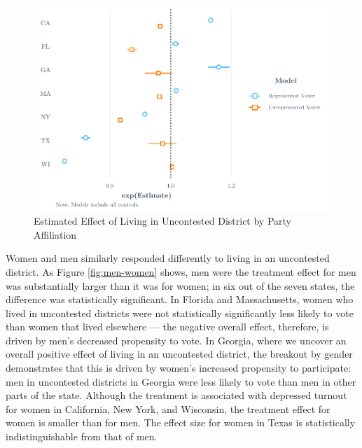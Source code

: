 \documentclass[
  12pt,
]{article}
\begin{document}
\begin{figure}[H]

{\centering \includegraphics{write_files/figure-latex/party-1} 

}

\caption{\label{fig:party}Estimated Effect of Living in Uncontested District by Party Affiliation}\label{fig:party}
\end{figure}

Women and men similarly responded differently to living in an uncontested district. As Figure \ref{fig:men-women} shows, men were the treatment effect for men was substantially larger than it was for women; in six out of the seven states, the difference was statistically significant. In Florida and Massachusetts, women who lived in uncontested districts were not statistically significantly less likely to vote than women that lived elsewhere --- the negative overall effect, therefore, is driven by men's decreased propensity to vote. In Georgia, where we uncover an overall positive effect of living in an uncontested district, the breakout by gender demonstrates that this is driven by women's increased propensity to participate: men in uncontested districts in Georgia were less likely to vote than men in other parts of the state. Although the treatment is associated with depressed turnout for women in California, New York, and Wisconsin, the treatment effect for women is smaller than for men. The effect size for women in Texas is statistically indistinguishable from that of men.
\end{document}
